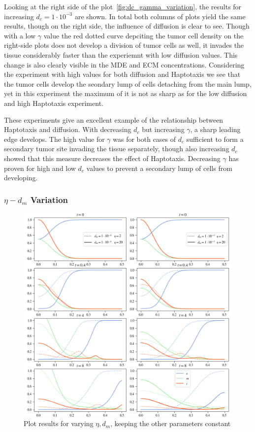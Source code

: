 Looking at the right side of the plot~\ref{fig:dc_gamma_variation}, the results for increasing $d_c=1\cdot 10^{-3}$ are shown. In total both columns of plots yield the same results, though on the right side, the influence of diffusion is clear to see. Though with a low $\gamma$ value the red dotted curve depciting the tumor cell density on the right-side plots does not develop a division of tumor cells as well, it invades the tissue considerably faster than the experiemnt with low diffusion values. This change is also clearly visible in the MDE and ECM concentrations. Considering the experiment with high values for both diffusion and Haptotaxis we see that the tumor cells develop the seondary lump of cells detaching from the main lump, yet in this experiment the maximum of it is not as sharp as for the low diffusion and high Haptotaxis experiment.

These experiments give an excellent example of the relationship between Haptotaxis and diffusion. With decreasing $d_c$ but increasing $\gamma$, a sharp leading edge develops. The high value for $\gamma$ was for both cases of $d_c$ sufficient to form a secondary tumor site invading the tissue separately, though also increasing $d_c$ showed that this measure decreases the effect of Haptotaxis. Decreasing $\gamma$ has proven for high and low $d_c$ values to prevent a secondary lump of cells from developing. 

\subsubsection*{$\eta - d_m$ Variation}
\begin{figure}[h!]
 \centering
 \includegraphics[width=\textwidth]{resources/images/dm_eta_variation.png}
 \caption{Plot results for varying $\eta, d_m$, keeping the other parameters constant}
 \label{fig:dm_eta_variation}
\end{figure}


